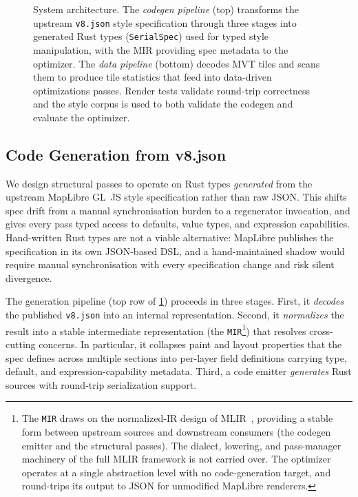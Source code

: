 \begin{figure}[htbp]
    \caption{
System architecture.
    The \emph{codegen pipeline} (top) transforms the upstream \texttt{v8.json} style specification through three stages into generated Rust types (\texttt{SerialSpec}) used for typed style manipulation, with the MIR providing spec metadata to the optimizer.
    The \emph{data pipeline} (bottom) decodes \acs{MVT} tiles and scans them to produce tile statistics that feed into data-driven optimizations passes.
Render tests validate round-trip correctness and the style corpus is used to both validate the codegen and evaluate the optimizer.}
    \label{fig:system_architecture}
\end{figure}

\subsection{Code Generation from v8.json}\label{sub:codegen}

We design structural passes to operate on Rust types \emph{generated} from the upstream MapLibre GL~JS style specification rather than raw \ac{JSON}.
This shifts spec drift from a manual synchronisation burden to a regenerator invocation, and gives every pass typed access to defaults, value types, and expression capabilities.
Hand-written Rust types are not a viable alternative: MapLibre publishes the specification in its own \ac{JSON}-based \ac{DSL}, and a hand-maintained shadow would require manual synchronisation with every specification change and risk silent divergence.

The generation pipeline (top row of \cref{fig:system_architecture}) proceeds in three stages.
First, it \emph{decodes} the published \texttt{v8.json} into an internal representation.
Second, it \emph{normalizes} the result into a stable intermediate representation (the \texttt{MIR}\footnote{The \texttt{MIR} draws on the normalized-IR design of MLIR~\cite{lattnerMLIRScalingCompiler2021}, providing a stable form between upstream sources and downstream consumers (the codegen emitter and the structural passes).
The dialect, lowering, and pass-manager machinery of the full MLIR framework is not carried over.
The optimizer operates at a single abstraction level with no code-generation target, and round-trips its output to JSON for unmodified MapLibre renderers.}) that resolves cross-cutting concerns.
In particular, it collapses paint and layout properties that the spec defines across multiple sections into per-layer field definitions carrying type, default, and expression-capability metadata.
Third, a code emitter \emph{generates} Rust sources with round-trip serialization support.

